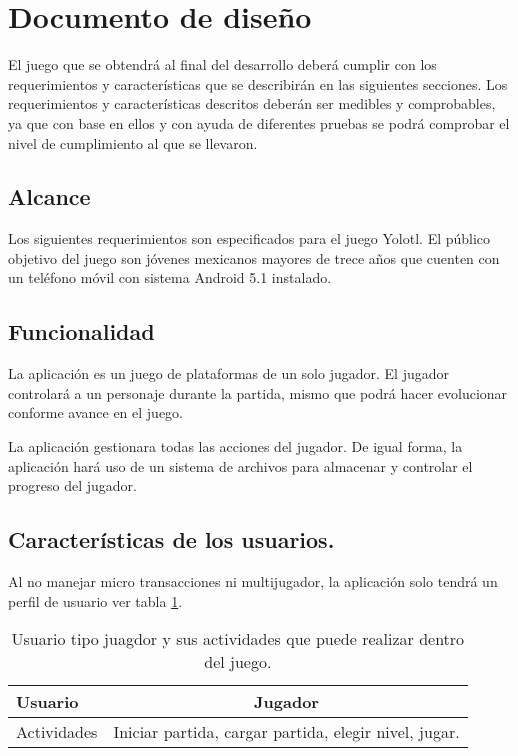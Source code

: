 \section{Documento de diseño}
El juego que se obtendrá al final del desarrollo deberá cumplir con los requerimientos y características que se describirán en las siguientes secciones. Los requerimientos y características descritos deberán ser medibles y comprobables, ya que con base en ellos y con ayuda de diferentes pruebas se podrá comprobar el nivel de cumplimiento al que se llevaron.
	\subsection{Alcance}
	Los siguientes requerimientos son especificados para el juego Yolotl. El público objetivo del juego son jóvenes mexicanos mayores de trece años que cuenten con un teléfono móvil con sistema Android 5.1 instalado.   
	\subsection{Funcionalidad}
	La aplicación es un juego de plataformas de un solo jugador. El jugador controlará a un personaje durante la partida, mismo que podrá hacer evolucionar conforme avance en el juego.
	\\
	\par
La aplicación gestionara todas las acciones del jugador. De igual forma, la aplicación hará uso de un sistema de archivos para almacenar y controlar el progreso del jugador.
\subsection{Características de los usuarios.}
Al no manejar micro transacciones ni multijugador, la aplicación solo tendrá un perfil de usuario ver tabla \ref{tab:TipoUsuario}.
		\begin{table} 
			\centering 
			\begin{tabular}{|l | c |} 
				\hline		
				\rowcolor{cyan}Usuario & Jugador\\ 
				\hline 
				Actividades & Iniciar partida, cargar partida, elegir nivel, jugar.\\ 
				\hline 
			\end{tabular}
			\caption{Usuario tipo juagdor y sus actividades que puede realizar dentro del juego.} 
			\label{tab:TipoUsuario}
		\end{table}
